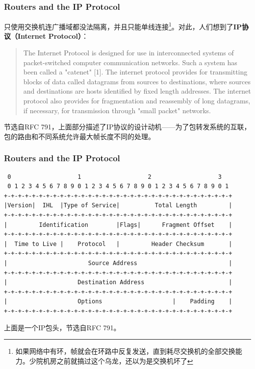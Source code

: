 \documentclass[11pt]{beamer}
\begin{document}
\begin{frame}
\frametitle{Routers and the IP Protocol}
只使用交换机连广播域都没法隔离，并且只能单线连接\footnote{如果网络中有环，帧就会在环路中反复发送，直到耗尽交换机的全部交换能力。少院机房之前就搞过这个乌龙，还以为是交换机坏了}。对此，人们想到了\textbf{IP协议（Internet Protocol）}：
\begin{quote}
The Internet Protocol is designed for use in interconnected systems of packet-switched computer communication networks.  Such a system has been called a "catenet" [1].  The internet protocol provides for  transmitting blocks of data called datagrams from sources to destinations, where sources and destinations are hosts identified by fixed length addresses.  The internet protocol also provides for fragmentation and reassembly of long datagrams, if necessary, for transmission through "small packet" networks.
\end{quote}

节选自RFC 791，上面部分描述了IP协议的设计动机——为了包转发系统的互联，包的路由和不同系统允许最大帧长度不同的处理。
\end{frame}

\begin{frame}[fragile]
\frametitle{Routers and the IP Protocol}
\fontsize{9pt}{9pt}
\begin{verbatim}
 0                   1                   2                   3
 0 1 2 3 4 5 6 7 8 9 0 1 2 3 4 5 6 7 8 9 0 1 2 3 4 5 6 7 8 9 0 1
+-+-+-+-+-+-+-+-+-+-+-+-+-+-+-+-+-+-+-+-+-+-+-+-+-+-+-+-+-+-+-+-+
|Version|  IHL  |Type of Service|          Total Length         |
+-+-+-+-+-+-+-+-+-+-+-+-+-+-+-+-+-+-+-+-+-+-+-+-+-+-+-+-+-+-+-+-+
|         Identification        |Flags|      Fragment Offset    |
+-+-+-+-+-+-+-+-+-+-+-+-+-+-+-+-+-+-+-+-+-+-+-+-+-+-+-+-+-+-+-+-+
|  Time to Live |    Protocol   |         Header Checksum       |
+-+-+-+-+-+-+-+-+-+-+-+-+-+-+-+-+-+-+-+-+-+-+-+-+-+-+-+-+-+-+-+-+
|                       Source Address                          |
+-+-+-+-+-+-+-+-+-+-+-+-+-+-+-+-+-+-+-+-+-+-+-+-+-+-+-+-+-+-+-+-+
|                    Destination Address                        |
+-+-+-+-+-+-+-+-+-+-+-+-+-+-+-+-+-+-+-+-+-+-+-+-+-+-+-+-+-+-+-+-+
|                    Options                    |    Padding    |
+-+-+-+-+-+-+-+-+-+-+-+-+-+-+-+-+-+-+-+-+-+-+-+-+-+-+-+-+-+-+-+-+
\end{verbatim}
\fontsize{11pt}{11pt}
上面是一个IP包头，节选自RFC 791。
\end{frame}
\end{document}
